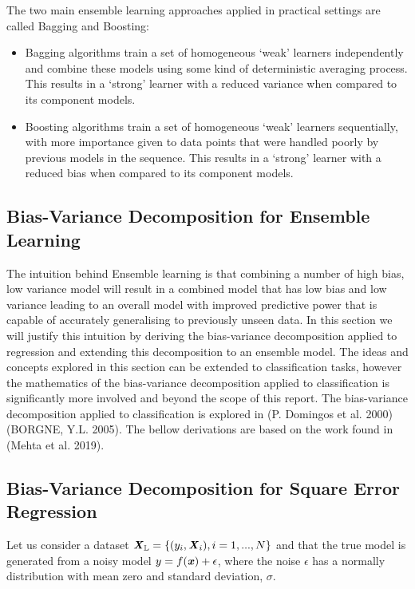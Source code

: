 \documentclass[../SMLreport_template.tex]{subfiles}
\begin{document}
The two main ensemble learning approaches applied in practical settings are called Bagging and Boosting:
\begin{itemize}
    \item Bagging algorithms train a set of homogeneous ‘weak’ learners independently and combine these models using some kind of deterministic averaging process. This results in a ‘strong’ learner with a reduced variance when compared to its component models. 
    
    \item Boosting algorithms train a set of homogeneous ‘weak’ learners sequentially, with more importance given to data points that were handled poorly by previous models in the sequence. This results in a ‘strong’ learner with a reduced bias when compared to its component models.
\end{itemize}

\subsection{Bias-Variance Decomposition for Ensemble Learning}
The intuition behind Ensemble learning is that combining a number of high bias, low variance model will result in a combined model that has low bias and low variance leading to an overall model with improved predictive power that is capable of accurately generalising to previously unseen data. In this section we will justify this intuition by deriving the bias-variance decomposition applied to regression and extending this decomposition to an ensemble model. The ideas and concepts explored in this section can be extended to classification tasks, however the mathematics of the bias-variance decomposition applied to classification is significantly more involved and beyond the scope of this report. The bias-variance decomposition applied to classification is explored in (P. Domingos et al. 2000)(BORGNE, Y.L. 2005). The bellow derivations are based on the work found in (Mehta et al. 2019).

\subsection{Bias-Variance Decomposition for Square Error Regression}
Let us consider a dataset \(\textbf{\textit{X}}_\mathbb{L} = \{(y_i, \textbf{\textit{X}}_i), i = 1, ..., N\}\) and that the true model is generated from a noisy model \(y = f(\textbf{\textit{x}}) + \epsilon\), where the noise \(\epsilon\) has a normally distribution with mean zero and standard deviation, \(\sigma\).
\end{document}
